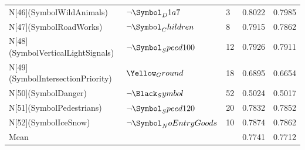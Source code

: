 \begin{tabular}{lllll}
N[46](SymbolWildAnimals) & $\neg \Symbol_D1a7$ & 3 & 0.8022 & 0.7985 \\
N[47](SymbolRoadWorks) & $\neg \Symbol_Children$ & 8 & 0.7915 & 0.7862 \\
N[48](SymbolVerticalLightSignals) & $\neg \Symbol_Speed100$ & 12 & 0.7926 & 0.7911 \\
N[49](SymbolIntersectionPriority) & $\Yellow_Ground$ & 18 & 0.6895 & 0.6654 \\
N[50](SymbolDanger) & $\neg \Black_Symbol$ & 52 & 0.5024 & 0.5017 \\
N[51](SymbolPedestrians) & $\neg \Symbol_Speed120$ & 20 & 0.7832 & 0.7852 \\
N[52](SymbolIceSnow) & $\neg \Symbol_NoEntryGoods$ & 10 & 0.7874 & 0.7862 \\
Mean &  &  & 0.7741 & 0.7712 \\
\bottomrule
\end{tabular}
